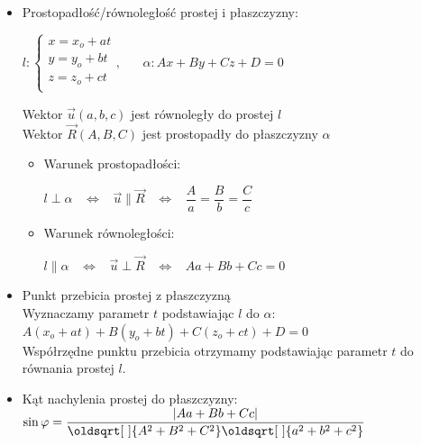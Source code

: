 \documentclass[10pt, twoside, fleqn]{article}
\renewcommand*{\sqrt}[2][\ ]{\oldsqrt[#1]{#2}}
\begin{document}
\begin{itemize}

\item Prostopadłość/równoległość prostej i płaszczyzny:

			\hspace{50pt}
				$ l: \left\{
  						\begin{array}{l}
    							x = x_o + at \\
    							y = y_o + bt \\
    							z = z_o + ct \\
  						\end{array} \right., 
  				\hspace{20pt}
  				  \alpha: Ax + By + Cz + D = 0 $
  			
  			Wektor $\vec{u}(a,b,c)$ jest równoległy do prostej $l$
  			\\Wektor $\vec{R}(A,B,C)$ jest prostopadły do
  			  płaszczyzny $\alpha$ 
  			  
  	\begin{itemize}
  	
  			\item Warunek prostopadłości: 
  			
  			\hspace{50pt}
				$ l \perp \alpha
						\hspace{10pt}
  						\Leftrightarrow
						\hspace{10pt}
  						\vec{u} \parallel \vec{R}
  						\hspace{10pt}
  						\Leftrightarrow
  						\hspace{10pt}
  				  \dfrac{A}{a} = 
				  \dfrac{B}{b} =
				  \dfrac{C}{c} $
				  
			\item Warunek równoległości:
			
			\hspace{50pt}
				$ l \parallel \alpha
						\hspace{10pt}
  						\Leftrightarrow
						\hspace{10pt}
  						\vec{u} \perp \vec{R}
  						\hspace{10pt}
  						\Leftrightarrow
  						\hspace{10pt}
  				  Aa + Bb + Cc = 0 $		
	\end{itemize}
				
\vspace{10pt}	  
\item Punkt przebicia prostej z płaszczyzną
			\\Wyznaczamy parametr $t$ podstawiając $l$ do $\alpha$:
				$ A(x_o + at) + B(y_o + bt) + C(z_o + ct) + D = 0 $
			\\Współrzędne punktu przebicia otrzymamy podstawiając 
			  parametr $t$ do równania prostej $l$.
			  
\vspace{10pt}	  
\item Kąt nachylenia prostej do płaszczyzny: \hspace{10pt}
			$ \sin{\varphi} = 
				\dfrac{|Aa+Bb+Cc|}
					  { \sqrt{A^2 + B^2 + C^2}
	 			  		\sqrt{a^2 + b^2 + c^2} } $



\end{itemize}	
\end{document}

